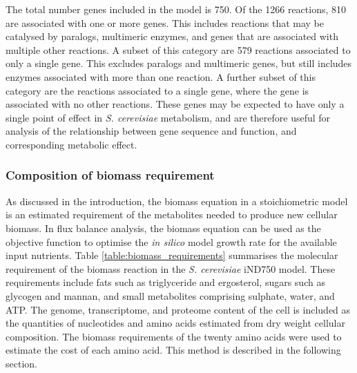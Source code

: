 The total number genes included in the model is 750. Of the 1266 reactions, 810 are associated with one or more genes. This includes reactions that may be catalysed by paralogs, multimeric enzymes, and genes that are associated with multiple other reactions. A subset of this category are 579 reactions associated to only a single gene. This excludes paralogs and multimeric genes, but still includes enzymes associated with more than one reaction. A further subset of this category are the reactions associated to a single gene, where the gene is associated with no other reactions. These genes may be expected to have only a single point of effect in \emph{S. cerevisiae} metabolism, and are therefore useful for analysis of the relationship between gene sequence and function, and corresponding metabolic effect.

\subsubsection{Composition of biomass requirement}%

As discussed in the introduction, the biomass equation in a stoichiometric model is an estimated requirement of the metabolites needed to produce new cellular biomass. In flux balance analysis, the biomass equation can be used as the objective function to optimise the \emph{in silico} model growth rate for the available input nutrients. Table \vref{table:biomass_requirements} summarises the molecular requirement of the biomass reaction in the \emph{S. cerevisiae} iND750 model. These requirements include fats such as triglyceride and ergosterol, sugars such as glycogen and mannan, and small metabolites comprising sulphate, water, and ATP. The genome, transcriptome, and proteome content of the cell is included as the quantities of nucleotides and amino acids estimated from dry weight cellular composition. The biomass requirements of the twenty amino acids were used to estimate the cost of each amino acid. This method is described in the following section.

